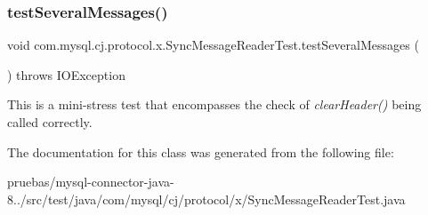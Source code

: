 \subsubsection{\texorpdfstring{test\+Several\+Messages()}{testSeveralMessages()}}
{\footnotesize\ttfamily void com.\+mysql.\+cj.\+protocol.\+x.\+Sync\+Message\+Reader\+Test.\+test\+Several\+Messages (\begin{DoxyParamCaption}{ }\end{DoxyParamCaption}) throws I\+O\+Exception}

This is a \textquotesingle{}mini\textquotesingle{}-\/stress test that encompasses the check of {\itshape clear\+Header()} being called correctly. 

The documentation for this class was generated from the following file\+:\begin{DoxyCompactItemize}
\item 
pruebas/mysql-\/connector-\/java-\/8../src/test/java/com/mysql/cj/protocol/x/Sync\+Message\+Reader\+Test.\+java\end{DoxyCompactItemize}
